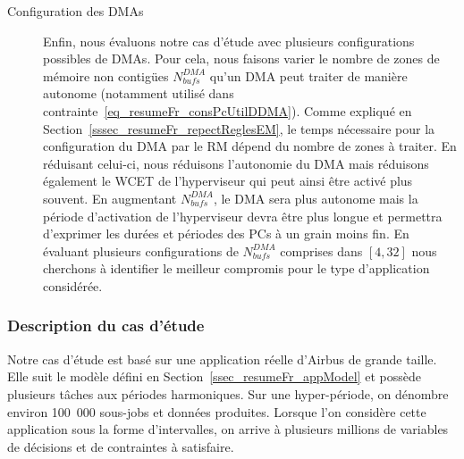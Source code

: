 \documentclass[main.tex]{subfiles}
\begin{document}
\begin{description}
    \item[Configuration des DMAs]
        Enfin, nous évaluons notre cas d'étude avec plusieurs configurations possibles de DMAs. Pour cela, nous faisons varier le nombre de zones de mémoire non contigües $N_{bufs}^{DMA}$ qu'un DMA peut traiter de manière autonome (notamment utilisé dans contrainte~\ref{eq_resumeFr_consPcUtilDDMA}). Comme expliqué en Section~\ref{sssec_resumeFr_repectReglesEM}, le temps nécessaire pour la configuration du DMA par le RM dépend du nombre de zones à traiter. En réduisant celui-ci, nous réduisons l'autonomie du DMA mais réduisons également le WCET de l'hyperviseur qui peut ainsi être activé plus souvent. En augmentant $N_{bufs}^{DMA}$, le DMA sera plus autonome mais la période d'activation de l'hyperviseur devra être plus longue et permettra d'exprimer les durées et périodes des PCs à un grain moins fin. En évaluant plusieurs configurations de $N_{bufs}^{DMA}$ comprises dans $[4,32]$ nous cherchons à identifier le meilleur compromis pour le type d'application considérée.
\end{description}

\subsubsection{Description du cas d'étude}
Notre cas d'étude est basé sur une application réelle d'Airbus de grande taille. Elle suit le modèle défini en Section~\ref{ssec_resumeFr_appModel} et possède plusieurs tâches aux périodes harmoniques. Sur une hyper-période, on dénombre environ 100~000 sous-jobs et données produites. Lorsque l'on considère cette application sous la forme d'intervalles, on arrive à plusieurs millions de variables de décisions et de contraintes à satisfaire.
\end{document}
